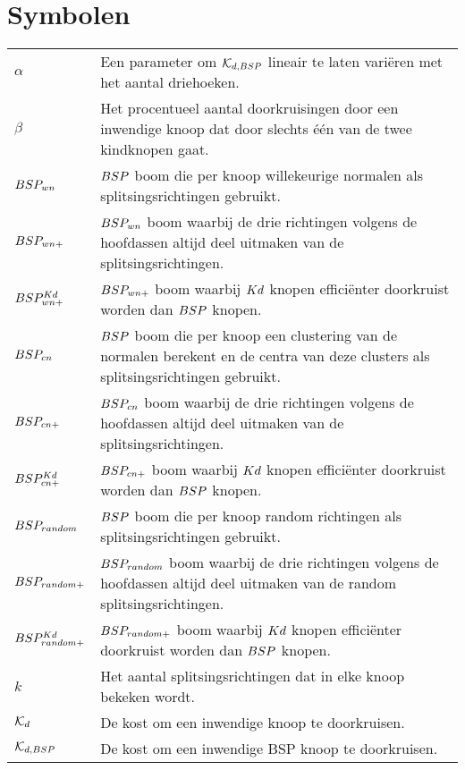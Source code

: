 \documentclass[master=cws,masteroption=mmc,oneside,english]{kulemt}
\begin{document}
\section*{Symbolen}
\begin{flushleft}
  \renewcommand{\arraystretch}{1.1}
  \begin{tabularx}{\textwidth}{@{}p{25mm}X@{}}
    $\alpha$ & Een parameter om $\mathcal{K}_{d,BSP}$ lineair te laten variëren met het aantal driehoeken. \\
    $\beta$ & Het procentueel aantal doorkruisingen door een inwendige knoop dat door slechts één van de twee kindknopen gaat. \\
    $BSP_{wn}$ & $BSP$ boom die per knoop willekeurige normalen als splitsingsrichtingen gebruikt. \\
    $BSP_{wn+}$ & $BSP_{wn}$ boom waarbij de drie richtingen volgens de hoofdassen altijd deel uitmaken van de splitsingsrichtingen. \\
    $BSP^{Kd}_{wn+}$ & $BSP_{wn+}$ boom waarbij $Kd$ knopen efficiënter doorkruist worden dan $BSP$ knopen. \\
    $BSP_{cn}$ & $BSP$ boom die per knoop een clustering van de normalen berekent en de centra van deze clusters als splitsingsrichtingen gebruikt. \\
    $BSP_{cn+}$ & $BSP_{cn}$ boom waarbij de drie richtingen volgens de hoofdassen altijd deel uitmaken van de splitsingsrichtingen. \\
    $BSP^{Kd}_{cn+}$ & $BSP_{cn+}$ boom waarbij $Kd$ knopen efficiënter doorkruist worden dan $BSP$ knopen. \\
    $BSP_{random}$ & $BSP$ boom die per knoop random richtingen als splitsingsrichtingen gebruikt. \\
    $BSP_{random+}$ & $BSP_{random}$ boom waarbij de drie richtingen volgens de hoofdassen altijd deel uitmaken van de random splitsingsrichtingen. \\
    $BSP^{Kd}_{random+}$ & $BSP_{random+}$ boom waarbij $Kd$ knopen efficiënter doorkruist worden dan $BSP$ knopen. \\
    $k$ & Het aantal splitsingsrichtingen dat in elke knoop bekeken wordt. \\
    $\mathcal{K}_{d}$ & De kost om een inwendige knoop te doorkruisen. \\
    $\mathcal{K}_{d,BSP}$ & De kost om een inwendige BSP knoop te doorkruisen. \\

\end{tabularx}
\end{flushleft}
\end{document}
